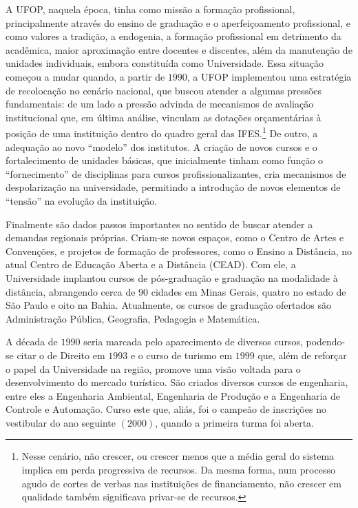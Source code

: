 A UFOP, naquela época, tinha como missão a formação profissional, principalmente através do ensino de graduação e o aperfeiçoamento profissional, e como valores a tradição, a endogenia, a formação profissional em detrimento da acadêmica, maior aproximação entre docentes e discentes, além da manutenção de unidades individuais, embora constituída como Universidade. Essa situação começou a mudar quando, a partir de $1990$, a UFOP implementou uma estratégia de recolocação no cenário nacional, que buscou atender a algumas pressões fundamentais: de um lado a pressão advinda de mecanismos de avaliação institucional que, em última análise, vinculam as dotações orçamentárias à posição de uma instituição dentro do quadro geral das IFES.\footnote{Nesse cenário, não crescer, ou crescer menos que a média geral do sistema implica em perda progressiva de recursos. Da mesma forma, num processo agudo de cortes de verbas nas instituições de financiamento, não crescer em qualidade também significava privar-se de recursos.} De outro, a adequação ao novo ``modelo'' dos institutos. A criação de novos cursos e o fortalecimento de unidades básicas, que inicialmente tinham como função o ``fornecimento'' de disciplinas para cursos profissionalizantes, cria mecanismos de despolarização na universidade, permitindo a introdução de novos elementos de ``tensão'' na evolução da instituição.

Finalmente são dados passos importantes no sentido de buscar atender a demandas regionais próprias. Criam-se novos espaços, como o Centro de Artes e Convenções, e projetos de formação de professores, como o Ensino a Distância, no atual Centro de Educação Aberta e a Distância (CEAD). Com ele, a Universidade implantou cursos de pós-graduação e graduação na modalidade à distância, abrangendo cerca de $90$ cidades em Minas Gerais, quatro no estado de São Paulo e oito na Bahia. Atualmente, os cursos de graduação ofertados são Administração Pública, Geografia, Pedagogia e Matemática.

A década de $1990$ seria marcada pelo aparecimento de diversos cursos, podendo-se citar o de Direito em $1993$ e o curso de turismo em $1999$ que, além de reforçar o papel da Universidade na região, promove uma visão voltada para o desenvolvimento do mercado turístico. São criados diversos cursos de engenharia, entre eles a Engenharia Ambiental, Engenharia de Produção e a Engenharia de Controle e Automação. Curso este que, aliás, foi o campeão de inscrições no vestibular do ano seguinte $(2000)$, quando a primeira turma foi aberta.


